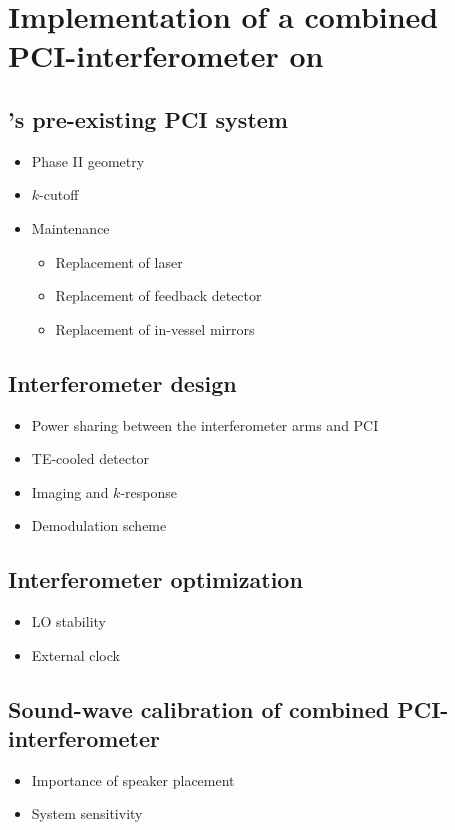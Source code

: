 \chapter{Implementation of a combined PCI-interferometer on \diiid}

\section{\diiid's pre-existing PCI system}
\begin{itemize}
  \item Phase II geometry
  \item $k$-cutoff
  \item Maintenance
    \begin{itemize}
      \item Replacement of laser
      \item Replacement of feedback detector
      \item Replacement of in-vessel mirrors
    \end{itemize}
\end{itemize}

\section{Interferometer design}
\begin{itemize}
  \item Power sharing between the interferometer arms and PCI
  \item TE-cooled detector
  \item Imaging and $k$-response
  \item Demodulation scheme
\end{itemize}

\section{Interferometer optimization}
\begin{itemize}
  \item LO stability
  \item External clock
\end{itemize}

\section{Sound-wave calibration of combined PCI-interferometer}
\begin{itemize}
  \item Importance of speaker placement
  \item System sensitivity
\end{itemize}
